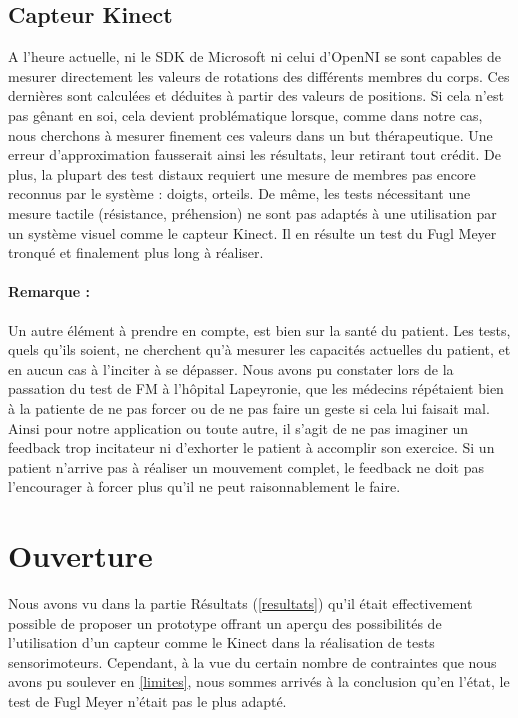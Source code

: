 \documentclass[french,12pt]{report}
\begin{document}
		\subsection{Capteur Kinect}
A l'heure actuelle, ni le SDK de Microsoft ni celui d'OpenNI se sont capables de mesurer directement les valeurs de rotations des 
différents membres du corps. Ces dernières sont calculées et déduites à partir des valeurs de positions. Si cela n'est pas gênant en soi, cela devient problématique lorsque, comme dans notre cas, nous cherchons à mesurer finement ces valeurs dans un but thérapeutique. Une erreur d'approximation fausserait ainsi les résultats, leur retirant tout crédit.
De plus, la plupart des test distaux requiert une mesure de membres pas encore reconnus par le système : doigts, orteils.
De même, les tests nécessitant une mesure tactile (résistance, préhension) ne sont pas adaptés à une utilisation par un système visuel comme le capteur Kinect. Il en résulte un test du Fugl Meyer tronqué et finalement plus long à réaliser.

\paragraph{Remarque :\\}
Un autre élément à prendre en compte, est bien sur la santé du patient. Les tests, quels qu'ils soient, ne cherchent qu'à mesurer
les capacités actuelles du patient, et en aucun cas à l'inciter à se dépasser. Nous avons pu constater lors de la passation
du test de FM à l'hôpital Lapeyronie, que les médecins répétaient bien à la patiente de ne pas forcer ou de ne pas faire un geste
si cela lui faisait mal.\\
Ainsi pour notre application ou toute autre, il s'agit de ne pas imaginer un feedback trop incitateur ni d'exhorter le patient à 
accomplir son exercice. Si un patient n'arrive pas à réaliser un mouvement complet, le feedback ne doit pas l'encourager à forcer plus qu’il ne peut raisonnablement le faire.
		
		\section{Ouverture}	%
Nous avons vu dans la partie Résultats (\ref{resultats}) qu'il était effectivement possible de proposer un prototype offrant un aperçu des possibilités de l'utilisation d'un capteur comme le Kinect dans la réalisation de tests sensorimoteurs. Cependant, à la vue du certain nombre de contraintes que nous avons pu soulever en \ref{limites}, nous sommes arrivés à la conclusion qu'en l'état, le test de Fugl Meyer n'était pas le plus adapté. 
\end{document}
